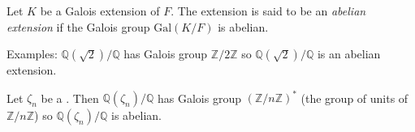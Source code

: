 \documentclass[12pt]{article}
\begin{document}
Let $K$ be a Galois extension of $F$. The extension is said to be an 
{\em abelian extension} if the Galois group $\textrm{Gal$(K/F)$}$ is abelian.

Examples: $\mathbb{Q}(\sqrt{2})/\mathbb{Q}$ has Galois group $\mathbb{Z}/2\mathbb{Z}$ so
$\mathbb{Q}(\sqrt{2})/\mathbb{Q}$ is an abelian extension.

Let $\zeta_n$ be a . Then $\mathbb{Q}(\zeta_n)/\mathbb{Q}$ has
Galois group $(\mathbb{Z}/n\mathbb{Z})^*$ (the group of units of
$\mathbb{Z}/n\mathbb{Z}$) so $\mathbb{Q}(\zeta_n)/\mathbb{Q}$ is abelian.
\end{document}
